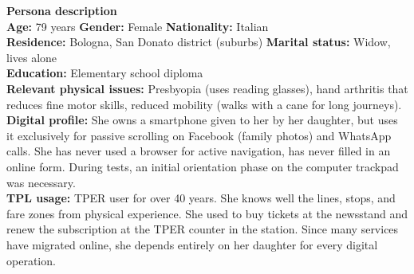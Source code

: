 ﻿\documentclass[11pt,a4paper]{article}
\begin{document}
\begin{tcolorbox}[base]
    \textbf{Persona description} \\[4pt]
    {\small
    \textbf{Age:} 79 years \hfill
    \textbf{Gender:} Female \hfill
    \textbf{Nationality:} Italian \\[2pt]
    \textbf{Residence:} Bologna, San Donato district (suburbs) \hfill
    \textbf{Marital status:} Widow, lives alone \\[2pt]
    \textbf{Education:} Elementary school diploma \\[2pt]
    \textbf{Relevant physical issues:} Presbyopia (uses reading glasses), hand arthritis that reduces fine motor skills, reduced mobility (walks with a cane for long journeys). \\[2pt]
    \textbf{Digital profile:} She owns a smartphone given to her by her daughter, but uses it exclusively for passive scrolling on Facebook (family photos) and WhatsApp calls. She has never used a browser for active navigation, has never filled in an online form. During tests, an initial orientation phase on the computer trackpad was necessary. \\[2pt]
    \textbf{TPL usage:} TPER user for over 40 years. She knows well the lines, stops, and fare zones from physical experience. She used to buy tickets at the newsstand and renew the subscription at the TPER counter in the station. Since many services have migrated online, she depends entirely on her daughter for every digital operation.
    }
\end{tcolorbox}

\end{document}
